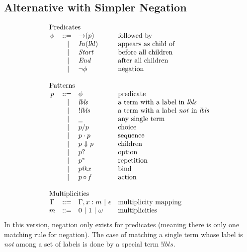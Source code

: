 \documentclass{article}
\makeatletter
\newcommand{\lbl}{\ensuremath{\mathit{lbl}}}
\newcommand{\lbls}{\ensuremath{\mathit{lbls}}}
\newcommand{\pseq}[2]{\ensuremath{#1 \cdot #2}}
\newcommand{\por}[2]{\ensuremath{#1/#2}}
\newcommand{\children}[2]{\ensuremath{#1} \Downarrow #2}
\newcommand{\pnot}[1]{\ensuremath{\lnot #1}}
\newcommand{\maybe}[1]{\ensuremath{#1?}}
\newcommand{\many}[1]{\ensuremath{#1^*}}
\newcommand{\any}{\ensuremath{\text{\underline{\hspace{0.6em}}}}}
\newcommand{\bind}[2]{\ensuremath{#1@#2}}
\newcommand{\paction}[2]{\ensuremath{#1\mathop{\circ} #2}}
\newcommand{\fb}[1]{\ensuremath{\mathop{\rightarrow}(#1)}}
\newcommand{\pin}[1]{\ensuremath{\mathit{In}(#1)}}
\newcommand{\pstart}{\ensuremath{\mathit{Start}}}
\newcommand{\pend}{\ensuremath{\mathit{End}}}
\newcommand{\arrayheading}[2]{\multicolumn{#1}{l}{\mbox{#2}}}
\makeatother
\begin{document}
\subsection{Alternative with Simpler Negation}

\[
  \begin{array}{crll}
    \arrayheading{4}{Predicates}\\
      \phi & ::= & \fb{p}      & \text{followed by}         \\
           & ~|~ & \pin{\lbl}  & \text{appears as child of} \\
           & ~|~ & \pstart{}   & \text{before all children} \\
           & ~|~ & \pend{}     & \text{after all children}  \\
           & ~|~ & \pnot{\phi} & \text{negation}            \\
    \\
    \arrayheading{4}{Patterns}\\
      p & ::= & \phi            & \text{predicate}                          \\
        & ~|~ & \lbls           & \text{a term with a label in $\lbls$}     \\
        & ~|~ & !\lbls          & \text{a term with a label \emph{not} in $\lbls$}     \\
        & ~|~ & \any{}          & \text{any single term}                    \\
        & ~|~ & \por{p}{p}      & \text{choice}                             \\
        & ~|~ & \pseq{p}{p}     & \text{sequence}                           \\
        & ~|~ & \children{p}{p} & \text{children}                           \\
        & ~|~ & \maybe{p}       & \text{option}                             \\
        & ~|~ & \many{p}        & \text{repetition}                         \\
        & ~|~ & \bind{p}{x}     & \text{bind}                               \\
        & ~|~ & \paction{p}{f}  & \text{action}                             \\
    \\
    \arrayheading{4}{Multiplicities}\\
    \Gamma & ::= & \Gamma, x : m ~|~ \epsilon & \text{multiplicity mapping}\\
    m      & ::= & 0 ~|~ 1 ~|~ \omega & \text{multiplicities}
  \end{array}
\]
%
In this version, negation only exists for predicates (meaning
there is only one matching rule for negation). The case of
matching a single term whose label is \emph{not} among a set of
labels is done by a special term $!\lbls$.
\end{document}
